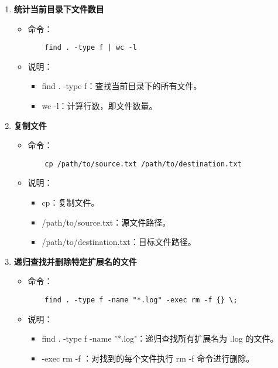 \documentclass[UTF8]{ctexart}
\begin{document}
\begin{enumerate}
  \item \textbf{统计当前目录下文件数目}
  \begin{itemize}
    \item 命令：
    \begin{verbatim}
    find . -type f | wc -l
    \end{verbatim}
    \item 说明：
    \begin{itemize}
      \item find . -type f：查找当前目录下的所有文件。
      \item wc -l：计算行数，即文件数量。
    \end{itemize}
  \end{itemize}

  \item \textbf{复制文件}
  \begin{itemize}
    \item 命令：
    \begin{verbatim}
    cp /path/to/source.txt /path/to/destination.txt
    \end{verbatim}
    \item 说明：
    \begin{itemize}
      \item cp：复制文件。
      \item /path/to/source.txt：源文件路径。
      \item /path/to/destination.txt：目标文件路径。
    \end{itemize}
  \end{itemize}

  \item \textbf{递归查找并删除特定扩展名的文件}
  \begin{itemize}
    \item 命令：
    \begin{verbatim}
    find . -type f -name "*.log" -exec rm -f {} \;
    \end{verbatim}
    \item 说明：
    \begin{itemize}
      \item find . -type f -name "*.log"：递归查找所有扩展名为 .log 的文件。
      \item -exec rm -f {} \;：对找到的每个文件执行 rm -f 命令进行删除。
    \end{itemize}
  \end{itemize}


\end{enumerate}
\end{document}
